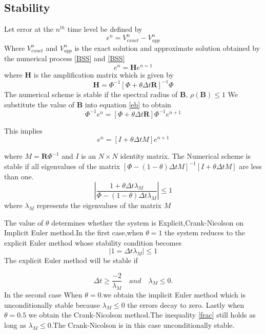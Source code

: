\documentclass[12pt]{article}
\numberwithin{equation}{section} %
\begin{document}
\subsection{Stability}

Let error at the $n^{th}$ time level be defined by
\begin{equation}
e^n=V^{n}_{exact}-V^{n}_{app}
\end{equation}
Where $V^{n}_{exact}$ and $V^{n}_{app}$ is the exact solution and
approximate solution obtained by the numerical process \ref{BSS} and
\ref{BSS}
\begin{equation}\label{eb}
e^n=\textbf{H}e^{n=1}
\end{equation}
where \textbf{H} is the amplification matrix which is given by
\begin{equation}
\textbf{H}=\Phi^{-1}[\Phi +\theta\Delta t \textbf{R}]^{-1}\Phi
\end{equation}
 The numerical scheme is stable if the spectral radius  of \textbf{B}, $\rho(\textbf{B})\leq 1$
We substitute the value of \textbf{B} into equation \ref{eb} to
obtain
\begin{equation}
[\Phi-(1-\theta)\Delta t M]\Phi^{-1}e^{n}=[\Phi +\theta \Delta t
\textbf{R}]\Phi^{-1}e^{n+1}
\end{equation}

This implies
\begin{equation}
[I-(1-\theta)\Delta tM)]e^{n}=[I+\theta\Delta tM]e^{n+1}
\end{equation}

where $M=\textbf{R}\Phi^{-1}$ and $I$ is an $N\times N$ identity
matrix.
 The Numerical scheme is stable if all eigenvalues of the matrix
$[\Phi-(1-\theta)\Delta t M]^{-1}[I+\theta\Delta tM]$ are less than
one.
\begin{equation}\label{frac}
\left|{\frac{1+\theta\Delta t\lambda_{M} }{\Phi-(1-\theta)\Delta
t\lambda_{M}}}\right| \leq 1
\end{equation}
where $\lambda_{M}$ represents the eigenvalues of the matrix $M$

The value  of $\theta$ determines whether the system is
Explicit,Crank-Nicolson on Implicit Euler method.In the first
case,when $\theta=1$ the system reduces to the explicit Euler method
whose stability condition becomes
\begin{equation}
|1=\Delta t\lambda_M|\leq 1
\end{equation}
The explicit Euler method will be stable if


\begin{equation}
\Delta t\geq\frac{-2}{\lambda_M}  \quad and  \quad \lambda_{M}\leq
0.
\end{equation}
In the second case When $\theta=0$.we obtain the implicit Euler
method which is unconditionally stable because $\lambda_M \leq 0$
the errors decay to zero. Lastly when $\theta =0.5$ we obtain the
Crank-Nicolson method.The inequality \ref{frac} still holds as long
as $\lambda_M \leq 0$.The Crank-Nicolson is in this case
unconditionally stable.
\end{document}
